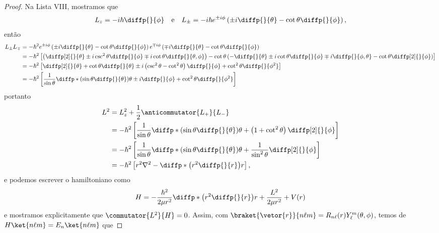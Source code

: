 \begin{proof}
    Na Lista VIII, mostramos que
    \begin{equation*}
        L_z = -i\hbar \diffp{}{\phi}\quad\text{e}\quad L_{\pm} = -i\hbar e^{\pm i \phi}\left(\pm i \diffp{}{\theta} - \cot\theta \diffp{}{\phi}\right),
    \end{equation*}
    então
    \begin{align*}
        L_\pm L_\mp &= -\hbar^2 e^{\pm i \phi}\left(\pm i \diffp{}{\theta} - \cot\theta \diffp{}{\phi}\right)e^{\mp i \phi}\left(\mp i \diffp{}{\theta} - \cot\theta \diffp{}{\phi}\right)\\
                    &= -\hbar^2 \left[\left(\diffp[2]{}{\theta} \pm i\csc^2\theta \diffp{}{\phi} \mp i \cot\theta \diffp{}{\theta,\phi}\right) - \cot\theta \left(- \diffp{}{\theta} \pm i \cot\theta \diffp{}{\phi} \mp i \diffp{}{\phi, \theta} - \cot\theta \diffp[2]{}{\phi}\right)\right]\\
                    &= -\hbar^2 \left[\diffp[2]{}{\theta} + \cot\theta \diffp{}{\theta} \pm i \left(\csc^2\theta - \cot^2\theta\right)\diffp{}{\phi} + \cot^2\theta \diffp{}{\phi^2}\right]\\
                    &= -\hbar^2\left[\frac{1}{\sin\theta}\diffp*{\left(\sin\theta\diffp{}{\theta}\right)}{\theta}  \pm i \diffp{}{\phi} + \cot^2\theta \diffp{}{\phi^2}\right]
    \end{align*}
    portanto
    \begin{align*}
        L^2 &= L_z^2 + \frac12 \anticommutator{L_+}{L_-}\\
            &= -\hbar^2 \left[\frac{1}{\sin\theta}\diffp*{\left(\sin\theta \diffp{}{\theta}\right)}{\theta} + \left(1 + \cot^2\theta\right)\diffp[2]{}{\phi}\right]\\
            &= - \hbar^2\left[\frac{1}{\sin\theta}\diffp*{\left(\sin\theta \diffp{}{\theta}\right)}{\theta} + \frac{1}{\sin^2\theta}\diffp[2]{}{\phi}\right]\\
            &= -\hbar^2\left[r^2\nabla^2 - \diffp*{\left(r^2 \diffp{}{r}\right)}{r}\right],
    \end{align*}
    e podemos escrever o hamiltoniano como
    \begin{equation*}
        H = -\frac{\hbar^2}{2\mu r^2}\diffp*{\left(r^2 \diffp{}{r}\right)}{r} + \frac{L^2}{2\mu r^2} + V(r)
    \end{equation*}
    e mostramos explicitamente que \(\commutator{L^2}{H} = 0\). Assim, com \(\braket{\vetor{r}}{n\ell m} = R_{n\ell}(r) Y_\ell^m(\theta,\phi)\), temos de \(H\ket{n\ell m} = E_n \ket{n\ell m}\) que

\end{proof}
